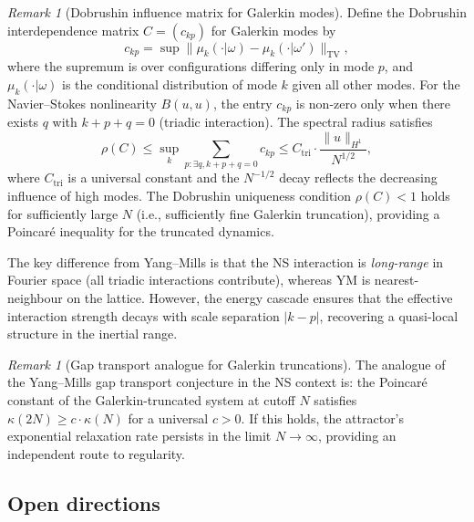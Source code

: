 \documentclass[12pt,a4paper]{article}
\theoremstyle{definition}
\theoremstyle{plain}
\theoremstyle{remark}
\newtheorem{remark}[definition]{Remark}
\begin{document}
\begin{remark}[Dobrushin influence matrix for Galerkin modes]
\label{rem:dobrushin-galerkin}
Define the Dobrushin interdependence matrix $C = (c_{kp})$ for Galerkin modes by
\[
c_{kp} = \sup \| \mu_k(\cdot | \omega) - \mu_k(\cdot | \omega') \|_{\mathrm{TV}},
\]
where the supremum is over configurations differing only in mode $p$, and $\mu_k(\cdot | \omega)$ is the conditional distribution of mode $k$ given all other modes. For the Navier--Stokes nonlinearity $B(u, u)$, the entry $c_{kp}$ is non-zero only when there exists $q$ with $k + p + q = 0$ (triadic interaction). The spectral radius satisfies
\[
\rho(C) \leq \sup_k \sum_{p: \exists q, k+p+q=0} c_{kp} \leq C_{\mathrm{tri}} \cdot \frac{\|u\|_{H^1}}{N^{1/2}},
\]
where $C_{\mathrm{tri}}$ is a universal constant and the $N^{-1/2}$ decay reflects the decreasing influence of high modes. The Dobrushin uniqueness condition $\rho(C) < 1$ holds for sufficiently large $N$ (i.e., sufficiently fine Galerkin truncation), providing a Poincar\'e inequality for the truncated dynamics.

The key difference from Yang--Mills is that the NS interaction is \emph{long-range} in Fourier space (all triadic interactions contribute), whereas YM is nearest-neighbour on the lattice. However, the energy cascade ensures that the effective interaction strength decays with scale separation $|k - p|$, recovering a quasi-local structure in the inertial range.
\end{remark}

\begin{remark}[Gap transport analogue for Galerkin truncations]
\label{rem:gap-transport-galerkin}
The analogue of the Yang--Mills gap transport conjecture in the NS context is: the Poincar\'e constant of the Galerkin-truncated system at cutoff $N$ satisfies $\kappa(2N) \geq c \cdot \kappa(N)$ for a universal $c > 0$. If this holds, the attractor's exponential relaxation rate persists in the limit $N \to \infty$, providing an independent route to regularity.
\end{remark}

\subsection{Open directions}
\end{document}
